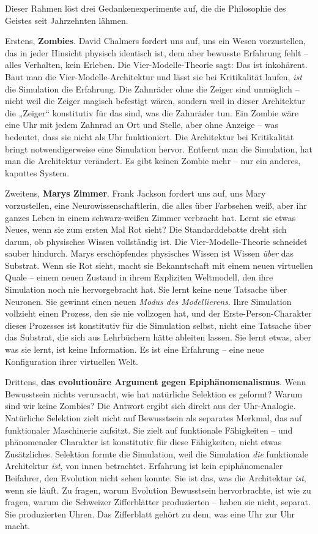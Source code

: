 \documentclass[11pt, twoside, openright]{book}
\begin{document}
Dieser Rahmen löst drei Gedankenexperimente auf, die die Philosophie des Geistes seit Jahrzehnten lähmen.

Erstens, \textbf{Zombies}. David Chalmers fordert uns auf, uns ein Wesen vorzustellen, das in jeder Hinsicht physisch identisch ist, dem aber bewusste Erfahrung fehlt -- alles Verhalten, kein Erleben. Die Vier-Modelle-Theorie sagt: Das ist inkohärent. Baut man die Vier-Modelle-Architektur und lässt sie bei Kritikalität laufen, \textit{ist} die Simulation die Erfahrung. Die Zahnräder ohne die Zeiger sind unmöglich -- nicht weil die Zeiger magisch befestigt wären, sondern weil in dieser Architektur die „Zeiger“ konstitutiv für das sind, was die Zahnräder tun. Ein Zombie wäre eine Uhr mit jedem Zahnrad an Ort und Stelle, aber ohne Anzeige -- was bedeutet, dass sie nicht als Uhr funktioniert. Die Architektur bei Kritikalität bringt notwendigerweise eine Simulation hervor. Entfernt man die Simulation, hat man die Architektur verändert. Es gibt keinen Zombie mehr -- nur ein anderes, kaputtes System.

Zweitens, \textbf{Marys Zimmer}. Frank Jackson fordert uns auf, uns Mary vorzustellen, eine Neurowissenschaftlerin, die alles über Farbsehen weiß, aber ihr ganzes Leben in einem schwarz-weißen Zimmer verbracht hat. Lernt sie etwas Neues, wenn sie zum ersten Mal Rot sieht? Die Standarddebatte dreht sich darum, ob physisches Wissen vollständig ist. Die Vier-Modelle-Theorie schneidet sauber hindurch. Marys erschöpfendes physisches Wissen ist Wissen \textit{über} das Substrat. Wenn sie Rot sieht, macht sie Bekanntschaft mit einem neuen virtuellen Quale -- einem neuen Zustand in ihrem Expliziten Weltmodell, den ihre Simulation noch nie hervorgebracht hat. Sie lernt keine neue Tatsache über Neuronen. Sie gewinnt einen neuen \textit{Modus des Modellierens}. Ihre Simulation vollzieht einen Prozess, den sie nie vollzogen hat, und der Erste-Person-Charakter dieses Prozesses ist konstitutiv für die Simulation selbst, nicht eine Tatsache über das Substrat, die sich aus Lehrbüchern hätte ableiten lassen. Sie lernt etwas, aber was sie lernt, ist keine Information. Es ist eine Erfahrung -- eine neue Konfiguration ihrer virtuellen Welt.

Drittens, \textbf{das evolutionäre Argument gegen Epiphänomenalismus}. Wenn Bewusstsein nichts verursacht, wie hat natürliche Selektion es geformt? Warum sind wir keine Zombies? Die Antwort ergibt sich direkt aus der Uhr-Analogie. Natürliche Selektion zielt nicht auf Bewusstsein als separates Merkmal, das auf funktionaler Maschinerie aufsitzt. Sie zielt auf funktionale Fähigkeiten -- und phänomenaler Charakter ist konstitutiv für diese Fähigkeiten, nicht etwas Zusätzliches. Selektion formte die Simulation, weil die Simulation \textit{die} funktionale Architektur \textit{ist}, von innen betrachtet. Erfahrung ist kein epiphänomenaler Beifahrer, den Evolution nicht sehen konnte. Sie ist das, was die Architektur \textit{ist}, wenn sie läuft. Zu fragen, warum Evolution Bewusstsein hervorbrachte, ist wie zu fragen, warum die Schweizer Zifferblätter produzierten -- haben sie nicht, separat. Sie produzierten Uhren. Das Zifferblatt gehört zu dem, was eine Uhr zur Uhr macht.
\end{document}
